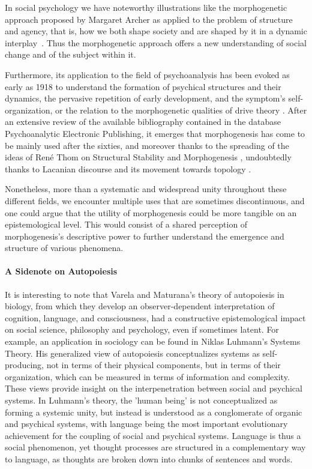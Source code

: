In social psychology we have noteworthy illustrations like the morphogenetic approach proposed by Margaret Archer as applied to the problem of structure and agency, that is, how we both shape society and are shaped by it in a dynamic interplay~\cite{archer_margaret_1999}. Thus the morphogenetic approach offers a new understanding of social change and of the subject within it.  

Furthermore, its application to the field of psychoanalysis has been evoked as early as 1918 to understand the formation of psychical structures and their dynamics, the pervasive repetition of early development, and the symptom’s self-organization, or the relation to the morphogenetic qualities of drive theory \cite{benedek_instinct_1973}. After an extensive review of the available bibliography contained in the database Psychoanalytic Electronic Publishing, it emerges that morphogenesis has come to be mainly used after the sixties, and moreover thanks to the spreading of the ideas of René Thom on Structural Stability and Morphogenesis \cite{de_luca_picione_processes_2016}, undoubtedly thanks to Lacanian discourse and its movement towards topology \cite{nasio_five_1998}. 

Nonetheless, more than a systematic and widespread unity throughout these different fields, we encounter multiple uses that are sometimes discontinuous, and one could argue that the utility of morphogenesis could be more tangible on an epistemological level. This would consist of a shared perception of morphogenesis’s descriptive power to further understand the emergence and structure of various phenomena.

\paragraph*{A Sidenote on Autopoiesis}

It is interesting to note that Varela and Maturana’s theory of autopoiesis in biology, from which they develop an observer-dependent interpretation of cognition, language, and consciousness, had a constructive epistemological impact on social science, philosophy and psychology, even if sometimes latent. For example, an application in sociology can be found in Niklas Luhmann's Systems Theory. His generalized view of autopoiesis conceptualizes systems as self-producing, not in terms of their physical components, but in terms of their organization, which can be measured in terms of information and complexity\cite{gershenson_requisite_2014}. These views provide insight on the interpenetration between social and psychical systems. In Luhmann's theory, the 'human being' is not conceptualized as forming a systemic unity, but instead is understood as a conglomerate of organic and psychical systems, with language being the most important evolutionary achievement for the coupling of social and psychical systems. Language is thus a social phenomenon, yet thought processes are structured in a complementary way to language, as thoughts are broken down into chunks of sentences and words. \cite{seidl_luhmanns_2004}

